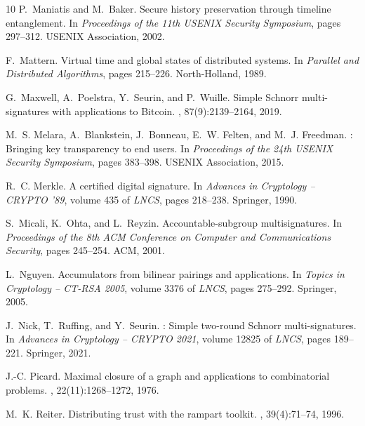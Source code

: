 \documentclass[11pt]{article}
\theoremstyle{definition}
\begin{document}
\begin{thebibliography}{10}
P.~Maniatis and M.~Baker.
\newblock Secure history preservation through timeline entanglement.
\newblock In {\em Proceedings of the 11th USENIX Security Symposium}, pages
  297--312. USENIX Association, 2002.

F.~Mattern.
\newblock Virtual time and global states of distributed systems.
\newblock In {\em Parallel and Distributed Algorithms}, pages 215--226.
  North-Holland, 1989.

G.~Maxwell, A.~Poelstra, Y.~Seurin, and P.~Wuille.
\newblock Simple {Schnorr} multi-signatures with applications to {Bitcoin}.
, 87(9):2139--2164, 2019.

M.~S. Melara, A.~Blankstein, J.~Bonneau, E.~W. Felten, and M.~J. Freedman.
: Bringing key transparency to end users.
\newblock In {\em Proceedings of the 24th USENIX Security Symposium}, pages
  383--398. USENIX Association, 2015.

R.~C. Merkle.
\newblock A certified digital signature.
\newblock In {\em Advances in Cryptology -- CRYPTO '89}, volume 435 of {\em
  LNCS}, pages 218--238. Springer, 1990.

S.~Micali, K.~Ohta, and L.~Reyzin.
\newblock Accountable-subgroup multisignatures.
\newblock In {\em Proceedings of the 8th ACM Conference on Computer and
  Communications Security}, pages 245--254. ACM, 2001.

L.~Nguyen.
\newblock Accumulators from bilinear pairings and applications.
\newblock In {\em Topics in Cryptology -- CT-RSA 2005}, volume 3376 of {\em
  LNCS}, pages 275--292. Springer, 2005.

J.~Nick, T.~Ruffing, and Y.~Seurin.
: Simple two-round {Schnorr} multi-signatures.
\newblock In {\em Advances in Cryptology -- CRYPTO 2021}, volume 12825 of {\em
  LNCS}, pages 189--221. Springer, 2021.

J.-C. Picard.
\newblock Maximal closure of a graph and applications to combinatorial
  problems.
, 22(11):1268--1272, 1976.

M.~K. Reiter.
\newblock Distributing trust with the rampart toolkit.
, 39(4):71--74, 1996.


\end{thebibliography}
\end{document}

